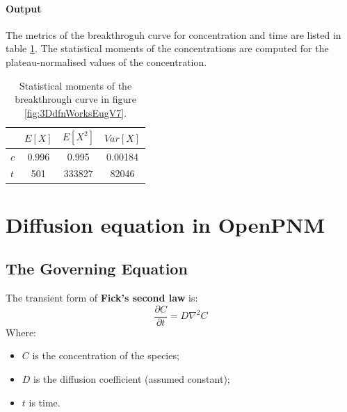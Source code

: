 \documentclass{article}
\begin{document}
\FloatBarrier  %
\paragraph{Output} The metrics of the breakthroguh curve for concentration and time are listed in table \ref{tab:StatMomV7}. The statistical moments of the concentrations are computed for the plateau-normalised values of the concentration.
\begin{table}[h!]
\centering
\begin{tabular}{lccc}
\toprule
        & $ E[X]$ & $E[X^2]$ & $Var[X]$ \\
\midrule
$c$     & 0.996        & 0.995           & 0.00184           \\
$t$     & 501          & 333827          & 82046             \\
\bottomrule
\end{tabular}
\caption{Statistical moments of the breakthrough curve in figure \ref{fig:3DdfnWorksEugV7}.}
\label{tab:StatMomV7}
\end{table}













\FloatBarrier  %
\section{Diffusion equation in OpenPNM}

\subsection{The Governing Equation}
The transient form of \textbf{Fick's second law} is:
\begin{equation}
    \frac{\partial C}{\partial t} = D \nabla^2 C
\end{equation}
Where:
\begin{itemize}
    \item $C$ is the concentration of the species;
    \item $D$ is the diffusion coefficient (assumed constant);
    \item $t$ is time.
\end{itemize}
\end{document}
